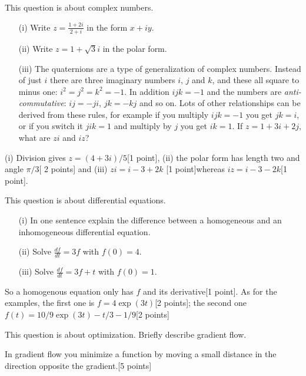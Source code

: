 \documentclass{uob-cs-exam}
\begin{document}
\begin{questions}
\question[5]
 This question is about complex numbers.  
  \begin{itemize}
 \item[(i)] Write $z=\frac{1+2i}{2+i}$ in the form $x+iy$. 
 \item[(ii)] Write $z=1+\sqrt{3}i$ in the polar form. 
\item[(iii)] The quaternions are a type of generalization of complex numbers. Instead of just $i$ there are three imaginary numbers $i$, $j$ and $k$, and these all square to minus one: $i^2=j^2=k^2=-1$. In addition $ijk=-1$ and the numbers are \textsl{anti-commutative}: $ij=-ji$, $jk=-kj$ and so on. Lots of other relationships can be derived from these rules, for example if you multiply $ijk=-1$ you get $jk=i$, or if you switch it $jik=1$ and multiply by $j$ you get $ik=1$. If $z=1+3i+2j$, what are $zi$ and $iz$?
 \end{itemize}
 
\droppoints
\begin{solution}
      (i) Division gives $z=(4+3i)/5$[1 point], (ii) the polar form has length two and angle $\pi/3$[ 2 points] and (iii) $zi=i-3+2k$ [1 point]whereas $iz=i-3-2k$[1 point].
\end{solution}

 \question[5]
 This question is about differential equations. 
 \begin{itemize}
 \item[(i)]  In one sentence explain the difference between a homogeneous and an inhomogeneous differential equation.
 \item[(ii)] Solve $\frac{df}{dt}=3f$ with $f(0)=4$.
 \item[(iii)] Solve $\frac{df}{dt}=3f+t$ with $f(0)=1$.
\end{itemize}

\droppoints
\begin{solution}
So a homogenous equation only has $f$ and its derivative[1 point]. As for the examples, the first one is $f=4\exp{(3t)}$[2 points]; the second one $f(t) = 10/9 \exp{(3t)} - t/3 - 1/9$[2 points]
\end{solution}

\question[5]
This question is about optimization. Briefly describe gradient flow.

\droppoints
\begin{solution}
In gradient flow you minimize a function by moving a small distance in the direction opposite the gradient.[5 points]
\end{solution}


\end{questions}
\end{document}
